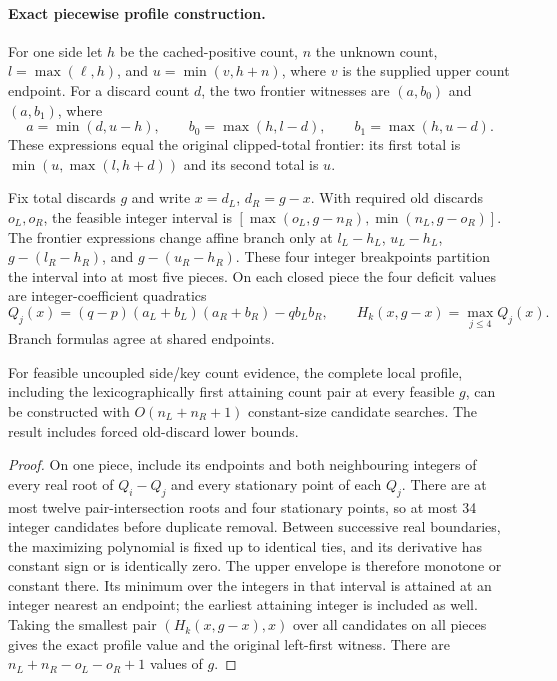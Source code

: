 \paragraph{Exact piecewise profile construction.}
For one side let $h$ be the cached-positive count, $n$ the unknown count,
$l=\max(\ell,h)$, and $u=\min(v,h+n)$, where $v$ is the supplied upper
count endpoint. For a discard count $d$, the two frontier witnesses are
$(a,b_0)$ and $(a,b_1)$, where
\[
 a=\min(d,u-h),\qquad b_0=\max(h,l-d),\qquad b_1=\max(h,u-d).
\]
These expressions equal the original clipped-total frontier: its first
total is $\min(u,\max(l,h+d))$ and its second total is $u$.

Fix total discards $g$ and write $x=d_L$, $d_R=g-x$. With required old
discards $o_L,o_R$, the feasible integer interval is
$[\max(o_L,g-n_R),\min(n_L,g-o_R)]$. The frontier expressions change
affine branch only at $l_L-h_L$, $u_L-h_L$,
$g-(l_R-h_R)$, and $g-(u_R-h_R)$. These four integer breakpoints
partition the interval into at most five pieces. On each closed piece
the four deficit values are integer-coefficient quadratics
\[
 Q_j(x)=(q-p)(a_L+b_L)(a_R+b_R)-q b_Lb_R,
 \qquad H_k(x,g-x)=\max_{j\leq4}Q_j(x).
\]
Branch formulas agree at shared endpoints.

\begin{theorem}
For feasible uncoupled side/key count evidence, the complete local profile,
including the lexicographically first attaining count pair at every feasible
$g$, can be constructed with $O(n_L+n_R+1)$ constant-size candidate searches.
The result includes forced old-discard lower bounds.
\end{theorem}
\begin{proof}
On one piece, include its endpoints and both neighbouring integers of every
real root of $Q_i-Q_j$ and every stationary point of each $Q_j$.
There are at most twelve pair-intersection roots and four stationary points,
so at most 34 integer candidates before duplicate removal. Between successive
real boundaries, the maximizing polynomial is fixed up to identical ties,
and its derivative has constant sign or is identically zero. The upper
envelope is therefore monotone or constant there. Its minimum over the
integers in that interval is attained at an integer nearest an endpoint;
the earliest attaining integer is included as well. Taking the smallest
pair $(H_k(x,g-x),x)$ over all candidates on all pieces gives the exact
profile value and the original left-first witness. There are
$n_L+n_R-o_L-o_R+1$ values of $g$.
\end{proof}

